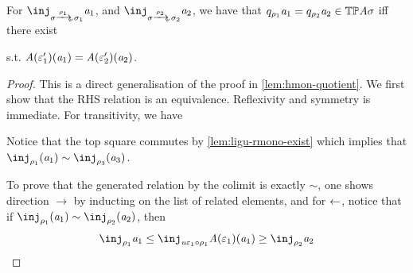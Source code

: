 \begin{lemma}\label{lem:thmon-quotient}
    For $\inj_{\sigma \xato{\rho_1} \sigma_1} \va_1$, and $\inj_{\sigma \xato{\rho_2} \sigma_2} \va_2$, 
    we have that $q_{\rho_1}\mathit{a}_1 = q_{\rho_2}\mathit{a}_2 \in {\mathbb{T}{\mathbb{P}}}\mathit{A}\sigma$ iff there exist 
    s.t. $\mathit{A}(\varepsilon_1')(\mathit{a}_1) = \mathit{A}(\varepsilon_2')(\mathit{a}_2)$.
\end{lemma}
\begin{proof}
    This is a direct generalisation of the proof in \cref{lem:hmon-quotient}. 
    We first show that the RHS relation is an equivalence. 
    Reflexivity and symmetry is immediate.
    For transitivity, we have
    \begin{center}
    \end{center}
    Notice that the top square commutes by \cref{lem:ligu-rmono-exist}
    which implies that $\inj_{\rho_1}(\va_1) \sim \inj_{\rho_3}(\va_3)$.

    To prove that the generated relation by the colimit is exactly $\sim$, one shows direction $\to$ by inducting on the list of related elements,
    and for $\leftarrow$, notice that if $\inj_{\rho_1}(\va_1) \sim \inj_{\rho_2}(\va_2)$, then
    \[ \inj_{\rho_1}\va_1 \leq \inj_{\instU\me_1 \comp \rho_1}\vA(\me_1)(\va_1) \ge \inj_{\rho_2}\va_2 \]

\end{proof}

